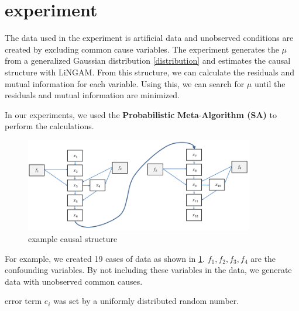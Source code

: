\documentclass[pdftex]{article}
\begin{document}
\section{experiment}
\label{sec:others}
The data used in the experiment is artificial data and unobserved conditions are created by excluding common cause variables.
The experiment generates the $\mu$ from a generalized Gaussian distribution \ref{distribution} and estimates the causal structure with LiNGAM. From this structure, we can calculate the residuals and mutual information for each variable.
Using this, we can search for $\mu$ until the residuals and mutual information are minimized.

In our experiments, we used the \textbf{Probabilistic} \textbf{Meta}-\textbf{Algorithm (SA) }to perform the calculations.
\begin{figure}[H]
	\centering
	\includegraphics[width=10cm]{fig2.png}
	\caption{example causal structure}
	\label{fig2}
\end{figure}

For example, we created 19 cases of data as shown in \ref{fig2}.
$f_{1},f_{2},f_{3},f_{4}$ are the confounding variables.
By not including these variables in the data, we generate data with unobserved common causes.
\par
error term $e_{i}$ was set by a uniformly distributed random number.
\par
{}
\par
{}
\end{document}
